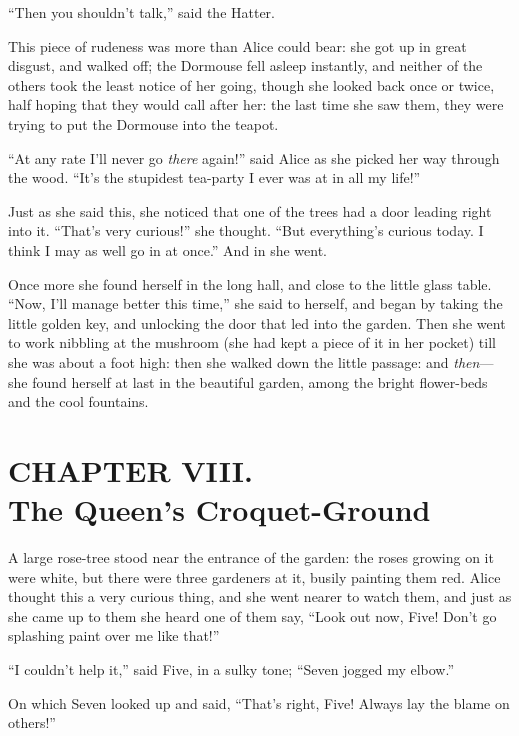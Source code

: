 \documentclass[11pt,openany,oneside]{book}
\begin{document}
“Then you shouldn’t talk,” said the Hatter. 

This piece of rudeness was more than Alice could bear: she got up in great disgust, and walked off; the Dormouse fell asleep instantly, and neither of the others took the least notice of her going, though she looked back once or twice, half hoping that they would call after her: the last time she saw them, they were trying to put the Dormouse into the teapot. 

“At any rate I’ll never go {\em there\/} again!” said Alice as she picked her way through the wood. “It’s the stupidest tea-party I ever was at in all my life!” 

Just as she said this, she noticed that one of the trees had a door leading right into it. “That’s very curious!” she thought. “But everything’s curious today. I think I may as well go in at once.” And in she went. 

Once more she found herself in the long hall, and close to the little glass table. “Now, I’ll manage better this time,” she said to herself, and began by taking the little golden key, and unlocking the door that led into the garden. Then she went to work nibbling at the mushroom (she had kept a piece of it in her pocket) till she was about a foot high: then she walked down the little passage: and {\em then\/}—she found herself at last in the beautiful garden, among the bright flower-beds and the cool fountains. 


\clearpage{}
{}
\chapter*{CHAPTER VIII.\\  The Queen’s Croquet-Ground}
\leavevmode\hypertarget{d11.fp119481}{}A large rose-tree stood near the entrance of the garden: the roses growing on it were white, but there were three gardeners at it, busily painting them red. Alice thought this a very curious thing, and she went nearer to watch them, and just as she came up to them she heard one of them say, “Look out now, Five! Don’t go splashing paint over me like that!” 

“I couldn’t help it,” said Five, in a sulky tone; “Seven jogged my elbow.” 

On which Seven looked up and said, “That’s right, Five! Always lay the blame on others!” 
\end{document}
